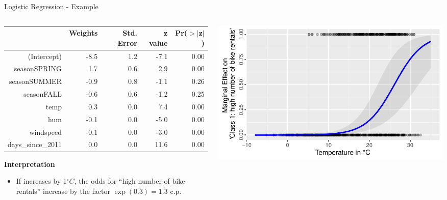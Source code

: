\documentclass[11pt,compress,t,notes=noshow, aspectratio=169, xcolor=table]{beamer}
\begin{document}
\begin{frame}{Logistic Regression - Example}
\begin{columns}[T]
\begin{column}{0.45\textwidth}
\begin{table}[ht]
\centering
\tiny
\begin{tabular}{rrrrr}
  \hline
 & Weights & Std. Error & z value & Pr($>$$|$z$|$) \\ 
  \hline
(Intercept) & -8.5 & 1.2 & -7.1 & 0.00 \\ 
  seasonSPRING & 1.7 & 0.6 & 2.9 & 0.00 \\ 
  seasonSUMMER & -0.9 & 0.8 & -1.1 & 0.26 \\ 
  seasonFALL & -0.6 & 0.6 & -1.2 & 0.25 \\ 
  temp & 0.3 & 0.0 & 7.4 & 0.00 \\ 
  hum & -0.1 & 0.0 & -5.0 & 0.00 \\ 
  windspeed & -0.1 & 0.0 & -3.0 & 0.00 \\ 
  days\_since\_2011 & 0.0 & 0.0 & 11.6 & 0.00 \\ 
   \hline
\end{tabular}
\end{table}
\pause
\textbf{Interpretation}
\begin{itemize}
    \item If  increases by 1$^\circ C$, the odds for ``high number of bike rentals'' increase by the factor $\exp (0.3) = 1.3$ c.p.
\end{itemize}
\end{column}
\hfill
\pause
\begin{column}{0.5\textwidth}
\includegraphics[width = \textwidth]{figure/logistic_maginal_temp.pdf}
\end{column}
\end{columns}

\end{frame}
\end{document}
